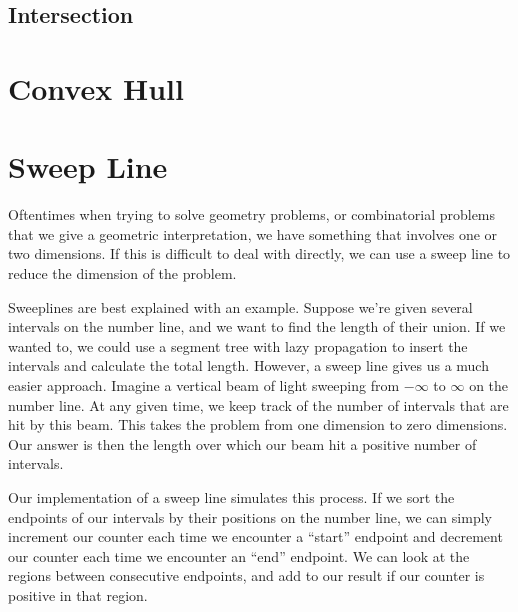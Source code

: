 \subsection{Intersection}

\section{Convex Hull}

\section{Sweep Line}

Oftentimes when trying to solve geometry problems, or combinatorial problems that we give a geometric interpretation, we have something that involves one or two dimensions. If this is difficult to deal with directly, we can use a sweep line to reduce the dimension of the problem.

Sweeplines are best explained with an example. Suppose we're given several intervals on the number line, and we want to find the length of their union. If we wanted to, we could use a segment tree with lazy propagation to insert the intervals and calculate the total length. However, a sweep line gives us a much easier approach. Imagine a vertical beam of light sweeping from $-\infty$ to $\infty$ on the number line. At any given time, we keep track of the number of intervals that are hit by this beam. This takes the problem from one dimension to zero dimensions. Our answer is then the length over which our beam hit a positive number of intervals.

Our implementation of a sweep line simulates this process. If we sort the endpoints of our intervals by their positions on the number line, we can simply increment our counter each time we encounter a ``start'' endpoint and decrement our counter each time we encounter an ``end'' endpoint. We can look at the regions between consecutive endpoints, and add to our result if our counter is positive in that region.

\begin{center}\end{center}

